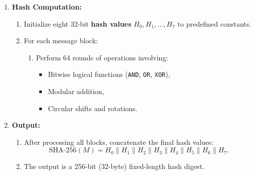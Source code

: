 \begin{Def}
\begin{enumerate}
        \item \textbf{Hash Computation:}
        \begin{enumerate}
            \item Initialize eight 32-bit \textbf{hash values} $H_0, H_1, \dots, H_7$ to predefined constants.
            \item For each message block:
            \begin{enumerate}
                \item Perform 64 rounds of operations involving:
                \begin{itemize}
                    \item Bitwise logical functions (\texttt{AND}, \texttt{OR}, \texttt{XOR}),
                    \item Modular addition,
                    \item Circular shifts and rotations.
                \end{itemize}
            \end{enumerate}
        \end{enumerate}
        
        \item \textbf{Output:}
        \begin{enumerate}
            \item After processing all blocks, concatenate the final hash values:
            \[
            \text{SHA-256}(M) = H_0 \| H_1 \| H_2 \| H_3 \| H_4 \| H_5 \| H_6 \| H_7.
            \]
            \item The output is a 256-bit (32-byte) fixed-length hash digest.
        \end{enumerate}
    \end{enumerate}
\end{Def}

\newpage

